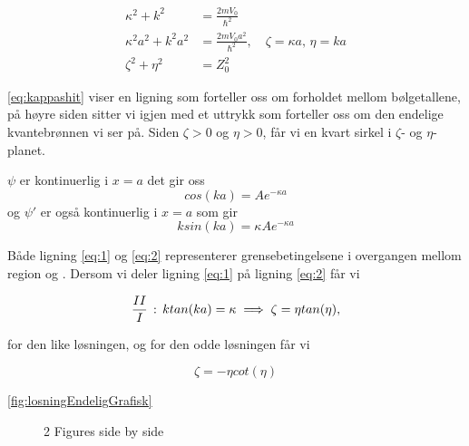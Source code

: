 \begin{equation}
\label{eq:kappashit}
    \begin{split}
        \kappa^2 + k^2 &= \frac{2mV_0}{\hbar^2} \\
        \kappa^2a^2 + k^2a^2 &= \frac{2mV_0a^2}{\hbar^2}, \quad \zeta = \kappa a,\, \eta = ka \\
        \zeta^2 + \eta^2 &= Z_0^2
    \end{split}
\end{equation}

\autoref{eq:kappashit} viser en ligning som forteller oss om forholdet mellom bølgetallene, på høyre siden sitter vi igjen med et uttrykk som forteller oss om den endelige kvantebrønnen vi ser på. Siden $\zeta> 0$ og $\eta>0$, får vi en kvart sirkel i $\zeta$- og $\eta$-planet.

$\psi$ er kontinuerlig i $x=a$ det gir oss
\begin{equation}
\label{eq:1}
    cos(ka)=Ae^{-\kappa a}
\end{equation}
og $\psi'$ er også kontinuerlig i $x = a$ som gir
\begin{equation}
\label{eq:2}
    ksin(ka) = \kappa Ae^{-\kappa a}
\end{equation}

Både ligning \ref{eq:1} og \ref{eq:2} representerer grensebetingelsene i overgangen mellom region  og . Dersom vi deler ligning \ref{eq:1} på ligning \ref{eq:2} får vi

\begin{equation}
\label{eq:even}
    \frac{\rom{2}}{\rom{1}} \, : \,
    ktan(ka) = \kappa \implies \zeta = \eta tan(\eta),
\end{equation}

for den like løsningen, og for den odde løsningen får vi

\begin{equation}
    \label{eq:odd}
    \zeta = -\eta cot(\eta)
\end{equation}

\autoref{fig:losningEndeligGrafisk} 

\begin{figure}[!htb]
    \centering
    \qquad
    \caption{2 Figures side by side}%
    \label{fig:losningEndeligGrafisk}%
\end{figure}

